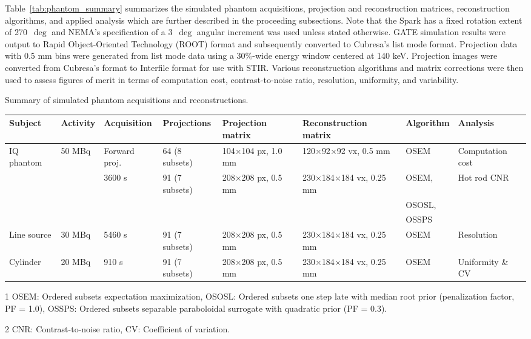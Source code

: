 \documentclass[utf8]{FrontiersinVancouver}
\begin{document}
Table~\ref{tab:phantom_summary} summarizes the simulated phantom acquisitions, projection and reconstruction matrices, reconstruction algorithms, and applied analysis which are further described in the proceeding subsections. Note that the Spark has a fixed rotation extent of 270~$\deg$ and NEMA's specification of a 3~$\deg$ angular increment was used unless stated otherwise. GATE simulation results were output to Rapid Object-Oriented Technology (ROOT) format and subsequently converted to Cubresa's list mode format. Projection data with 0.5 mm bins were generated from list mode data using a 30\%-wide energy window centered at 140 keV. Projection images were converted from Cubresa's format to Interfile format for use with STIR. Various reconstruction algorithms and matrix corrections were then used to assess figures of merit in terms of computation cost, contrast-to-noise ratio, resolution, uniformity, and variability.

\begin{threeparttable}[ht!]
\caption{Summary of simulated phantom acquisitions and reconstructions.\label{tab:phantom_summary}}
\footnotesize
\begin{tabular}{l l l l l l l l}
	\hline
	Subject & Activity & Acquisition & Projections & Projection matrix & Reconstruction matrix & Algorithm\footnotemark[1] & Analysis\footnotemark[2] \\ \hline
	
	IQ phantom & 50 MBq & Forward proj. & 64 (8 subsets) & 104$\times$104 px, 1.0 mm & 120$\times$92$\times$92 vx, 0.5 mm & OSEM & Computation cost	\\
	 & & 3600 s & 91 (7 subsets) & 208$\times$208 px, 0.5 mm & 230$\times$184$\times$184 vx, 0.25 mm & OSEM, & Hot rod $\mathrm{CNR}$ \\
	 & & & & & & OSOSL,	\\
	 & & & & & & OSSPS	\\
	
	Line source & 30 MBq & 5460 s & 91 (7 subsets) & 208$\times$208 px, 0.5 mm & 230$\times$184$\times$184 vx, 0.25 mm & OSEM & Resolution	\\
	
	
	Cylinder & 20 MBq & 910 s & 91 (7 subsets) & 208$\times$208 px, 0.5 mm & 230$\times$184$\times$184 vx, 0.25 mm & OSEM & Uniformity \& $\mathrm{CV}$	\\ \hline
	
\end{tabular}
\begin{tablenotes}
	\item[1] OSEM: Ordered subsets expectation maximization, OSOSL: Ordered subsets one step late with median root prior (penalization factor, PF = 1.0), OSSPS: Ordered subsets separable paraboloidal surrogate with quadratic prior (PF = 0.3).%
	\item[2] $\mathrm{CNR}$: Contrast-to-noise ratio, $\mathrm{CV}$: Coefficient of variation.
\end{tablenotes}
\end{threeparttable}
\end{document}
